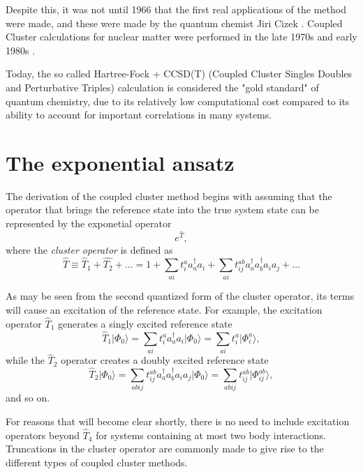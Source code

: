 Despite this, it was not until 1966 that the first real applications
of the method were made, and these were made by the quantum chemist Jiri
Cizek \cite{Cizek1966}. Coupled Cluster calculations for nuclear
matter were performed in the late 1970s and early 1980s \cite{kummel1978,day1981}.

Today, the so called Hartree-Fock + CCSD(T) (Coupled Cluster Singles
Doubles and Perturbative Triples) calculation is considered the "gold
standard" of quantum chemistry, due to its relatively low
computational cost compared to its ability to account for important
correlations in many systems.


\section{The exponential ansatz}
The derivation of the coupled cluster method begins with assuming that
the operator that brings the reference state into the true system
state can be represented by the exponetial operator
\begin{equation}
e^{\hat{T}} ,
\label{eqn:exponential_ansatz}
\end{equation}
where the \emph{cluster operator} is defined as
\begin{equation}
\hat{T} \equiv  \hat{T}_1 + \hat{T_2} + ... = 1 + \sum_{ai} t_i^a a_{a}^\dagger a_i + \sum_{ai} t_{ij}^{ab} a_{a}^\dagger a_{b}^\dagger a_i a_j + ...
\end{equation}

As may be seen from the second quantized form of the cluster operator,
its terms will cause an excitation of the reference state. For
example, the excitation operator $\hat{T}_1$ generates  a singly
excited reference state
\begin{equation}
\hat{T}_1\vert \Phi_0\rangle = \sum_{ai} t_i^a a_{a}^\dagger a_i|\Phi_0\rangle = \sum_{ai} t_i^a \vert \Phi_i^a\rangle,
\end{equation}
while the $\hat{T}_2$ operator creates a doubly excited reference state
\begin{equation}
\hat{T}_2 \vert \Phi_0\rangle = \sum_{abij} t_{ij}^{ab} a_{a}^\dagger a_{b}^\dagger a_i a_j|\Phi_0\rangle = \sum_{abij} t_{ij}^{ab} \vert \Phi_{ij}^{ab}\rangle,
\end{equation}
and so on. 

For reasons that will become clear shortly, there is no need to
include excitation operators beyond $\hat{T}_4$ for systems containing at most two body interactions. Truncations in the cluster operator are commonly made to give rise to the different
types of coupled cluster methods.

